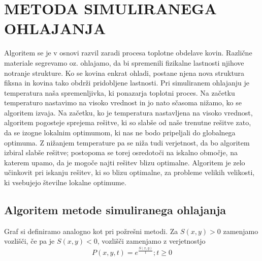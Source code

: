 \documentclass[12pt,a4paper]{amsart}
\theoremstyle{definition} %
\theoremstyle{plain} %
\begin{document}
\section{\textbf{METODA SIMULIRANEGA OHLAJANJA}}
Algoritem se je v osnovi razvil zaradi procesa toplotne obdelave kovin. Različne materiale segrevamo oz. ohlajamo, da bi spremenili fizikalne lastnosti njihove notranje strukture. Ko se kovina enkrat ohladi, postane njena nova struktura fiksna in kovina tako obdrži pridobljene lastnosti. Pri simuliranem ohlajanju je temperatura naša spremenljivka, ki ponazarja toplotni proces. Na začetku temperaturo nastavimo na visoko vrednost in jo nato sčasoma nižamo, ko se algoritem izvaja. Na začetku, ko je temperatura nastavljena na visoko vrednost, algoritem pogosteje sprejema rešitve, ki so slabše od naše trenutne rešitve zato, da se izogne lokalnim optimumom, ki nas ne bodo pripeljali do globalnega optimuma. Z nižanjem temperature pa se niža tudi verjetnost, da bo algoritem izbiral slabše rešitve; postopoma se torej osredotoči na iskalno območje, na katerem upamo, da je mogoče najti rešitev blizu optimalne. Algoritem je zelo učinkovit pri iskanju rešitev, ki so blizu optimalne, za probleme velikih velikosti, ki vsebujejo številne lokalne optimume.

\subsection{Algoritem metode simuliranega ohlajanja}
Graf si definiramo analogno kot pri požrešni metodi. Za $S(x,y)>0$ zamenjamo vozlišči, če pa je $S(x,y)<0$, vozlišči zamenjamo z verjetnostjo $$P(x,y,t) = e^{\frac{S(x,y)}{t}}; t\ge 0$$
\end{document}
